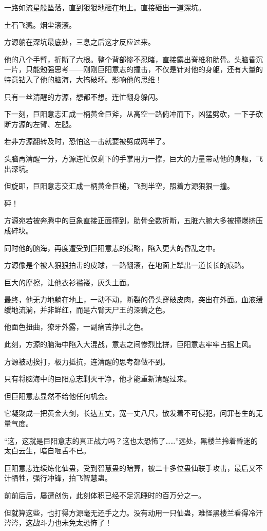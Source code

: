 \begin{this_body}
一路如流星般坠落，直到狠狠地砸在地上。直接砸出一道深坑。

土石飞溅。烟尘滚滚。

方源躺在深坑最底处，三息之后这才反应过来。

他的八个手臂，折断了六根。整个背部惨不忍睹，直接露出脊椎和肋骨。头脑昏沉一片，只能勉强思考——刚刚巨阳意志的撞击，不仅是针对他的身躯，还有大量的特意钻入了他的脑海，大搞破坏。影响他的思维！

只有一丝清醒的方源，想都不想。连忙翻身躲闪。

下一刻，巨阳意志汇成一柄黄金巨斧，从高空一路俯冲而下，凶猛劈砍，一下子砍断方源的左臂、左腿。

若非方源翻转及时，恐怕这一击就要被劈成两半了。

头脑再清醒一分，方源连忙仅剩下的手掌用力一撑，巨大的力量带动他的身躯，飞出深坑。

但旋即，巨阳意志交汇成一柄黄金巨槌，飞到半空，照着方源狠狠一撞。

砰！

方源宛若被奔腾中的巨象直接正面撞到，肋骨全数折断，五脏六腑大多被撞爆挤压成碎块。

同时他的脑海，再度遭受到巨阳意志的侵略，陷入更大的昏乱之中。

方源像是个被人狠狠拍击的皮球，一路翻滚，在地面上犁出一道长长的痕路。

巨大的摩擦，让他衣衫褴褛，灰头土面。

最终，他无力地躺在地上，一动不动，断裂的骨头穿破皮肉，突出在外面。血液缓缓地流淌，并非鲜红，而是六臂天尸王的深碧之色。

他面色扭曲，獠牙外露，一副痛苦挣扎之色。

此刻，方源的脑海中陷入大混战，意志之间惨烈比拼，巨阳意志牢牢占据上风。

方源被动挨打，极力抵抗，连清醒的思考都做不到。

只有将脑海中的巨阳意志剿灭干净，他才能重新清醒过来。

但巨阳意志显然不给他任何机会。

它凝聚成一把黄金大剑，长达五丈，宽一丈八尺，散发着不可侵犯，问罪苍生的无量气度。

“这，这就是巨阳意志的真正战力吗？这也太恐怖了……”远处，黑楼兰拎着昏迷的太白云生，暗自咂舌不已。

巨阳意志连续炼化仙蛊，受到智慧蛊的暗算，被二十多位蛊仙联手攻击，最后又不计牺牲，强行冲锋，拍飞智慧蛊。

前前后后，屡遭创伤，此刻体积已经不足沉睡时的百万分之一。

但就算这些，也打得方源毫无还手之力。没有动用一只仙蛊，难怪黑楼兰看得冷汗涔涔，这战斗力也未免太恐怖了！


\end{this_body}
